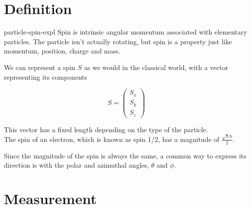 \documentclass[preview]{standalone}
\begin{document}
\genpage

\section{Definition}

\begin{snippet}{particle-spin-expl}
    Spin is intrinsic angular momentum associated with elementary particles.
    The particle isn't actually rotating, but spin is a property just like momentum, position, charge and mass.

    We can represent a spin \(S\) as we would in the classical world, with a vector representing its components

    \[
        S=
        \begin{pmatrix}
            S_x \\
            S_y \\
            S_z
        \end{pmatrix}
    \]

    This vector has a fixed length depending on the type of the particle. \\
    The spin of an electron, which is known as spin 1/2, has a magnitude of \(\frac{\sqrt{3}\hbar}{2}\).

    Since the magnitude of the spin is always the same, a common way to express its direction is with the polar and azimuthal angles, \(\theta\) and \(\phi\).
\end{snippet}

\section{Measurement}
\end{document}
